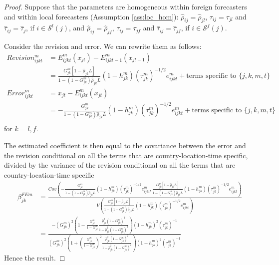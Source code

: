\begin{proof}

Suppose that the parameters are homogeneous within foreign forecasters and within local forecasters (Assumption \ref{ass:loc_hom}): $\hat\rho_{ij}=\hat\rho_{jl}$, $\tau_{ij}=\tau_{jl}$ and $\hat\tau_{ij}=\hat\tau_{j}$, if $i\in\mathcal{S}^l(j)$, and $\hat\rho_{ij}=\hat\rho_{jf}$, $\tau_{ij}=\tau_{jf}$ and $\hat\tau_{ij}=\hat\tau_{jf}$, if $i\in\mathcal{S}^f(j)$.

Consider the revision and error. We can rewrite them as follows:
$$\begin{array}{ll}Revision_{ijkt}^m&=E_{ijkt}^m(x_{jt})-E_{ijkt-1}^m(x_{jt-1})\\
																								&=\frac{G_{jk}^m[1-\hat\rho_{jk}L]}{1-(1-G_{jk}^m)\hat\rho_{jk}L}(1-h_{jk}^m)(\tau_{jk}^m)^{-1/2}e_{ijkt}^m+\text{terms specific to }\{j,k,m,t\}\\
Error_{ijkt}^m&=x_{jt}-E_{ijkt}^m(x_{jt})\\
																							&=-\frac{G_{jk}^m}{1-(1-G_{jk}^m)\hat\rho_{jk}L}(1-h_{jk}^m)(\tau_{jk}^m)^{-1/2}e_{ijkt}^m+\text{terms specific to }\{j,k,m,t\}\\
																								\end{array}$$
for $k=l,f$.

The estimated coefficient is then equal to the covariance between the error and the revision conditional on all the terms that are country-location-time specific, divided by the variance of the revision conditional on all the terms that are country-location-time specific
$$\begin{array}{ll}\beta^{FEm}_{jk}&=\frac{Cov\left(-\frac{G_{jk}^m}{1-(1-G_{jk}^m)\hat\rho_{jk}L}(1-h_{jk}^m)(\tau_{jk}^m)^{-1/2}e_{ijkt}^m,\frac{G_{jk}^m[1-\hat\rho_{jk}L]}{1-(1-G_{jk}^m)\hat\rho_{jk}L}(1-h_{jk}^m)(\tau_{jk}^m)^{-1/2}e_{ijkt}^m\right)}{V\left(\frac{G_{jk}^m[1-\hat\rho_{jk}L]}{1-(1-G_{jk}^m)\hat\rho_{jk}L}(1-h_{jk}^m)(\tau_{jk}^m)^{-1/2}e_{ijkt}^m\right)}\\
&=\frac{-(G_{jk}^m)^2\left(1-\frac{G_{jk}^m}{1-G_{jk}^m}\frac{\hat\rho_{jk}^{2}(1-G_{jk}^m)^{2}}{1-\hat\rho_{jk}^{2}(1-G_{jk}^m)^{2}}\right)(1-h_{jk}^m)^2(\tau_{jk}^m)^{-1}}{(G_{jk}^m)^2\left(1+\left(\frac{G_{jk}^m}{1-G_{jk}^m}\right)^2\frac{\hat\rho_{jk}^{2}(1-G_{jk}^m)^{2}}{1-\hat\rho_{jk}^{2}(1-G_{jk}^m)^{2}}\right)(1-h_{jk}^m)^2(\tau_{jk}^m)^{-1}}
\end{array}$$			
Hence the result.

\end{proof}


